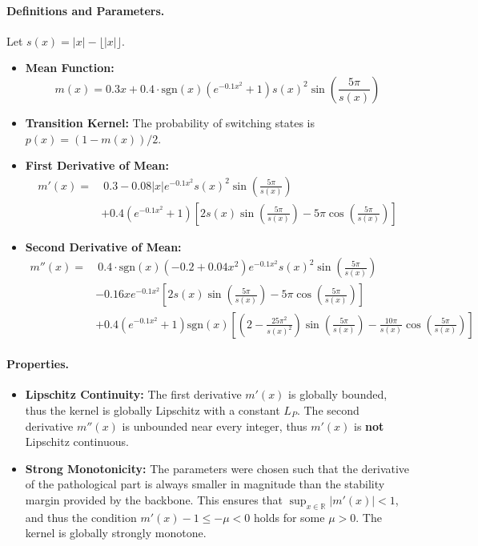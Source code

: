 \documentclass[a4paper]{article}
\begin{document}
\paragraph{Definitions and Parameters.}
Let $s(x) = |x| - \lfloor|x|\rfloor$.
\begin{itemize}
	\item \textbf{Mean Function:}
	\[ m(x) = 0.3x + 0.4 \cdot \text{sgn}(x)(e^{-0.1x^2}+1) s(x)^2 \sin\left(\frac{5\pi}{s(x)}\right) \]
	\item \textbf{Transition Kernel:} The probability of switching states is $p(x) = (1 - m(x))/2$.
	\item \textbf{First Derivative of Mean:}
	\[ \begin{aligned} m'(x) = & \ 0.3 - 0.08|x|e^{-0.1x^2}s(x)^2\sin\left(\frac{5\pi}{s(x)}\right) \\ & + 0.4(e^{-0.1x^2}+1)\left[2s(x)\sin\left(\frac{5\pi}{s(x)}\right) - 5\pi\cos\left(\frac{5\pi}{s(x)}\right)\right] \end{aligned} \]
	\item \textbf{Second Derivative of Mean:}
	\[ \begin{aligned} m''(x) = & \ 0.4 \cdot \text{sgn}(x)(-0.2+0.04x^2)e^{-0.1x^2}s(x)^2\sin\left(\frac{5\pi}{s(x)}\right) \\ & - 0.16xe^{-0.1x^2}\left[2s(x)\sin\left(\frac{5\pi}{s(x)}\right) - 5\pi\cos\left(\frac{5\pi}{s(x)}\right)\right] \\ & + 0.4(e^{-0.1x^2}+1)\text{sgn}(x)\left[\left(2 - \frac{25\pi^2}{s(x)^2}\right)\sin\left(\frac{5\pi}{s(x)}\right) - \frac{10\pi}{s(x)}\cos\left(\frac{5\pi}{s(x)}\right)\right] \end{aligned} \]
\end{itemize}

\paragraph{Properties.}
\begin{itemize}
	\item \textbf{Lipschitz Continuity:} The first derivative $m'(x)$ is globally bounded, thus the kernel is globally Lipschitz with a constant $L_P$. The second derivative $m''(x)$ is unbounded near every integer, thus $m'(x)$ is \textbf{not} Lipschitz continuous.
	\item \textbf{Strong Monotonicity:} The parameters were chosen such that the derivative of the pathological part is always smaller in magnitude than the stability margin provided by the backbone. This ensures that $\sup_{x \in \mathbb{R}} |m'(x)| < 1$, and thus the condition $m'(x) - 1 \le -\mu < 0$ holds for some $\mu > 0$. The kernel is globally strongly monotone.
\end{itemize}
\end{document}
